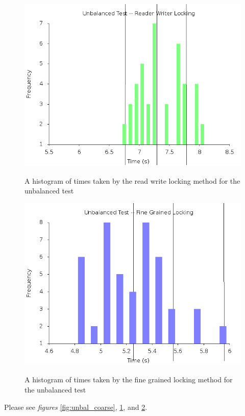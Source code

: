 \documentclass[paper=a4, fontsize=11pt]{scrartcl} %
\numberwithin{equation}{section} %
\numberwithin{figure}{section} %
\numberwithin{table}{section} %
\begin{document}
\begin{figure}[h]
  \caption{A histogram of times taken by the read write locking method for the unbalanced test} 
  \centering
  \includegraphics[width=\textwidth]{unbalanced_server_rw_final.png}
  \label{fig:unbal_rw}
\end{figure}

\begin{figure}[h]
  \caption{A histogram of times taken by the fine grained locking method for the unbalanced test} 
  \centering
  \includegraphics[width=\textwidth]{unbalanced_server_fine_final.png}
  \label{fig:unbal_fine}
\end{figure}
Please see \emph{figures} \ref{fig:unbal_coarse}, \ref{fig:unbal_rw}, and \ref{fig:unbal_fine}. 
\end{document}
